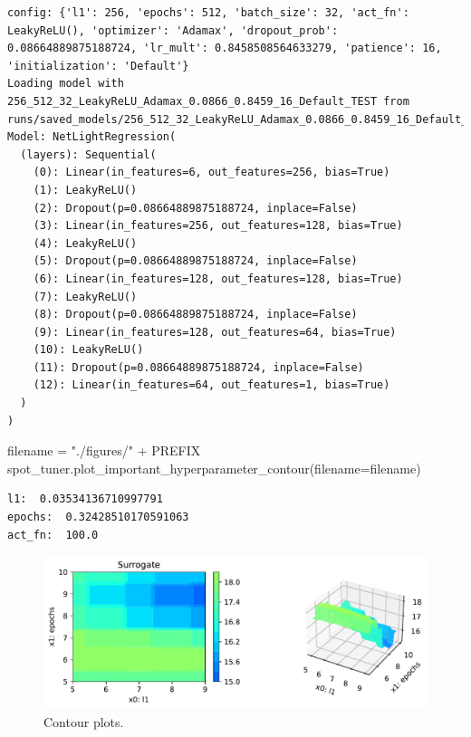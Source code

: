 \documentclass[
  letterpaper,
  DIV=11,
  numbers=noendperiod]{scrreprt}
\newenvironment{Shaded}{\begin{snugshade}}{\end{snugshade}}
\newcommand{\NormalTok}[1]{\textcolor[rgb]{0.00,0.23,0.31}{#1}}
\newcommand{\OperatorTok}[1]{\textcolor[rgb]{0.37,0.37,0.37}{#1}}
\newcommand{\StringTok}[1]{\textcolor[rgb]{0.13,0.47,0.30}{#1}}
\begin{document}
\begin{verbatim}
config: {'l1': 256, 'epochs': 512, 'batch_size': 32, 'act_fn': LeakyReLU(), 'optimizer': 'Adamax', 'dropout_prob': 0.08664889875188724, 'lr_mult': 0.8458508564633279, 'patience': 16, 'initialization': 'Default'}
Loading model with 256_512_32_LeakyReLU_Adamax_0.0866_0.8459_16_Default_TEST from runs/saved_models/256_512_32_LeakyReLU_Adamax_0.0866_0.8459_16_Default_TEST/last.ckpt
Model: NetLightRegression(
  (layers): Sequential(
    (0): Linear(in_features=6, out_features=256, bias=True)
    (1): LeakyReLU()
    (2): Dropout(p=0.08664889875188724, inplace=False)
    (3): Linear(in_features=256, out_features=128, bias=True)
    (4): LeakyReLU()
    (5): Dropout(p=0.08664889875188724, inplace=False)
    (6): Linear(in_features=128, out_features=128, bias=True)
    (7): LeakyReLU()
    (8): Dropout(p=0.08664889875188724, inplace=False)
    (9): Linear(in_features=128, out_features=64, bias=True)
    (10): LeakyReLU()
    (11): Dropout(p=0.08664889875188724, inplace=False)
    (12): Linear(in_features=64, out_features=1, bias=True)
  )
)
\end{verbatim}

\begin{Shaded}
\begin{Highlighting}[]
\NormalTok{filename }\OperatorTok{=} \StringTok{"./figures/"} \OperatorTok{+}\NormalTok{ PREFIX}
\NormalTok{spot\_tuner.plot\_important\_hyperparameter\_contour(filename}\OperatorTok{=}\NormalTok{filename)}
\end{Highlighting}
\end{Shaded}

\begin{verbatim}
l1:  0.03534136710997791
epochs:  0.32428510170591063
act_fn:  100.0
\end{verbatim}

\begin{figure}[H]

{\centering \includegraphics{033_spot_lightning_linear_sensitive_files/figure-pdf/cell-23-output-2.pdf}

}

\caption{Contour plots.}

\end{figure}%
\end{document}

